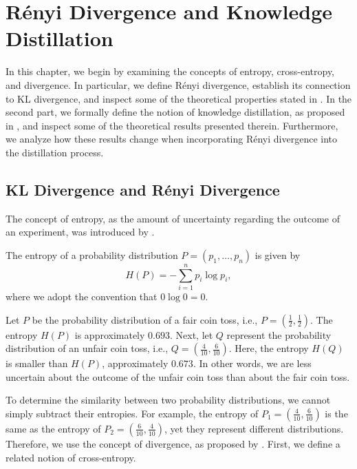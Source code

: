 \chapter{Rényi Divergence and Knowledge Distillation} 

In this chapter, we begin by examining the concepts of entropy, cross-entropy, and divergence. In particular, we define Rényi divergence, establish its connection to KL divergence, and inspect some of the theoretical properties stated in \cite{vanErvenHarremoës2012}. In the second part, we formally define the notion of knowledge distillation, as proposed in \cite{HintonVinyalsDean2015}, and inspect some of the theoretical results presented therein. Furthermore, we analyze how these results change when incorporating Rényi divergence into the distillation process.

\section{KL Divergence and Rényi Divergence}

The concept of entropy, as the amount of uncertainty regarding the outcome of an experiment, was introduced by \cite{Shannon1948}.

\begin{defn}
	The entropy of a probability distribution $P = (p_1,\ldots,p_n)$ is given by
	\begin{equation*}
		H(P) = -\sum_{i=1}^{n} p_i \log p_i,
	\end{equation*}
	where we adopt the convention that $0 \log 0 = 0$.
	\label{Entropy}
\end{defn}

\begin{example}
	Let $P$ be the probability distribution of a fair coin toss, i.e., $P = (\frac{1}{2},\frac{1}{2})$. The entropy $H(P)$ is approximately $0.693$. Next, let $Q$ represent the probability distribution of an unfair coin toss, i.e., $Q = (\frac{4}{10},\frac{6}{10})$. Here, the entropy $H(Q)$ is smaller than $H(P)$, approximately $0.673$. In other words, we are less uncertain about the outcome of the unfair coin toss than about the fair coin toss.
\end{example}

To determine the similarity between two probability distributions, we cannot simply subtract their entropies. For example, the entropy of $P_1 = (\frac{4}{10},\frac{6}{10})$ is the same as the entropy of $P_2 = (\frac{6}{10},\frac{4}{10})$, yet they represent different distributions. Therefore, we use the concept of divergence, as proposed by \cite{KullbackLeibler1951}. First, we define a related notion of cross-entropy.

